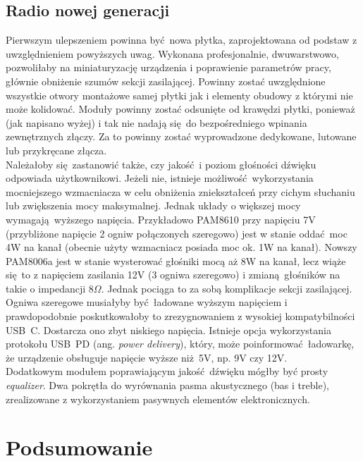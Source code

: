 \documentclass[12pt]{report}
\begin{document}
		\subsection{Radio nowej generacji}
			Pierwszym ulepszeniem powinna być nowa płytka, zaprojektowana od podstaw z uwzględnieniem powyższych uwag. Wykonana profesjonalnie, dwuwarstwowo, pozwoliłaby na miniaturyzację urządzenia i poprawienie parametrów pracy, głównie obniżenie szumów sekcji zasilającej. Powinny zostać uwzględnione wszystkie otwory montażowe samej płytki jak i elementy obudowy z którymi nie może kolidować. Moduły powinny zostać odsunięte od krawędzi płytki, ponieważ (jak napisano wyżej) i tak nie nadają się do bezpośredniego wpinania zewnętrznych złączy. Za to powinny zostać wyprowadzone dedykowane, lutowane lub przykręcane złącza.
			$ $\\

			Należałoby się zastanowić także, czy jakość i poziom głośności dźwięku odpowiada użytkownikowi. Jeżeli nie, istnieje możliwość wykorzystania mocniejszego wzmacniacza w celu obniżenia zniekształceń przy cichym słuchaniu lub zwiększenia mocy maksymalnej. Jednak układy o większej mocy wymagają wyższego napięcia.
			Przykładowo PAM8610\textsuperscript{\cite{ch5_pam8610}} przy napięciu 7V (przybliżone napięcie 2 ogniw połączonych szeregowo) jest w stanie oddać moc 4W na kanał (obecnie użyty wzmacniacz posiada moc ok. 1W na kanał). Nowszy PAM8006a\textsuperscript{\cite{ch5_pam8006a}} jest w stanie wysterować głośniki mocą aż 8W na kanał, lecz wiąże się to z napięciem zasilania 12V (3 ogniwa szeregowo) i zmianą głośników na takie o impedancji $8 \Omega$.
			Jednak pociąga to za sobą komplikacje sekcji zasilającej. Ogniwa szeregowe musiałyby być ładowane wyższym napięciem i prawdopodobnie poskutkowałoby to zrezygnowaniem z wysokiej kompatybilności USB~C. Dostarcza ono zbyt niskiego napięcia. Istnieje opcja wykorzystania protokołu USB~PD (ang. \textit{power delivery}), który, może poinformować ładowarkę, że urządzenie obsługuje napięcie wyższe niż 5V, np. 9V czy 12V.
			$ $\\
			
			Dodatkowym modułem poprawiającym jakość dźwięku mógłby być prosty \textit{equalizer}. Dwa pokrętła do wyrównania pasma akustycznego (bas i treble), zrealizowane z wykorzystaniem pasywnych elementów elektronicznych.
			
	\section{Podsumowanie}
	
\end{document}
